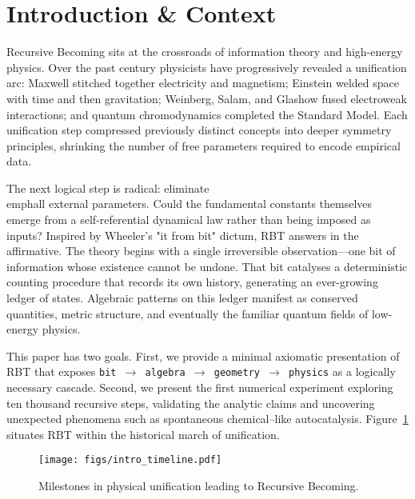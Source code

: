 \section{Introduction \& Context}
\label{sec:intro}

Recursive Becoming sits at the crossroads of information theory and high-energy physics.  Over the past century physicists have progressively revealed a unification arc: Maxwell stitched together electricity and magnetism; Einstein welded space with time and then gravitation; Weinberg, Salam, and Glashow fused electroweak interactions; and quantum chromodynamics completed the Standard Model.  Each unification step compressed previously distinct concepts into deeper symmetry principles, shrinking the number of free parameters required to encode empirical data.

The next logical step is radical: eliminate \\emph{all} external parameters.  Could the fundamental constants themselves emerge from a self-referential dynamical law rather than being imposed as inputs?  Inspired by Wheeler's "it from bit" dictum, RBT answers in the affirmative.  The theory begins with a single irreversible observation---one bit of information whose existence cannot be undone.  That bit catalyses a deterministic counting procedure that records its own history, generating an ever-growing ledger of states.  Algebraic patterns on this ledger manifest as conserved quantities, metric structure, and eventually the familiar quantum fields of low-energy physics.

This paper has two goals.  First, we provide a minimal axiomatic presentation of RBT that exposes \texttt{bit $\to$ algebra $\to$ geometry $\to$ physics} as a logically necessary cascade.  Second, we present the first numerical experiment exploring ten thousand recursive steps, validating the analytic claims and uncovering unexpected phenomena such as spontaneous chemical--like autocatalysis.  Figure~\ref{fig:intro-timeline} situates RBT within the historical march of unification.

\begin{figure}[h]
  \centering
  \texttt{[image: figs/intro\_timeline.pdf]}
  \caption{Milestones in physical unification leading to Recursive Becoming.}
  \label{fig:intro-timeline}
\end{figure}
\clearpage 